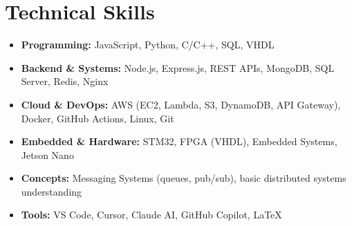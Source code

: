 \documentclass[a4paper,10.5pt]{article}
\begin{document}
\section{Technical Skills}

\begin{itemize}[nosep, leftmargin=1.5em, topsep=2pt]
  \item \textbf{Programming:} JavaScript, Python, C/C++, SQL, VHDL
  \item \textbf{Backend \& Systems:} Node.js, Express.js, REST APIs, MongoDB, SQL Server, Redis, Nginx
  \item \textbf{Cloud \& DevOps:} AWS (EC2, Lambda, S3, DynamoDB, API Gateway), Docker, GitHub Actions, Linux, Git
  \item \textbf{Embedded \& Hardware:} STM32, FPGA (VHDL), Embedded Systems, Jetson Nano
  \item \textbf{Concepts:} Messaging Systems (queues, pub/sub), basic distributed systems understanding
  \item \textbf{Tools:} VS Code, Cursor, Claude AI, GitHub Copilot, LaTeX
\end{itemize}
\end{document}
